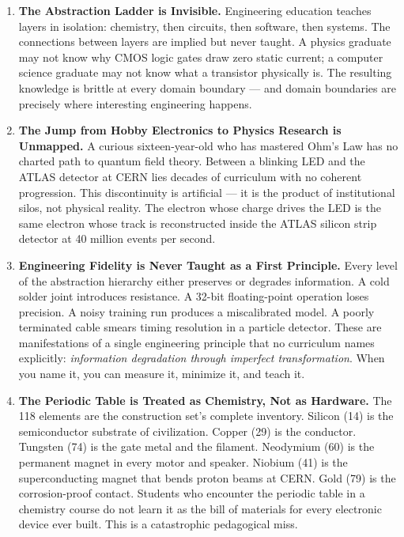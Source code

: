 \documentclass[11pt,letterpaper]{article}
\begin{document}
\begin{enumerate}[leftmargin=*, label=\textbf{P\arabic*.}]

\item \textbf{The Abstraction Ladder is Invisible.} Engineering education teaches layers in
isolation: chemistry, then circuits, then software, then systems. The connections between layers
are implied but never taught. A physics graduate may not know why CMOS logic gates draw zero
static current; a computer science graduate may not know what a transistor physically is. The
resulting knowledge is brittle at every domain boundary --- and domain boundaries are precisely
where interesting engineering happens.

\item \textbf{The Jump from Hobby Electronics to Physics Research is Unmapped.} A curious
sixteen-year-old who has mastered Ohm's Law has no charted path to quantum field theory. Between
a blinking LED and the ATLAS detector at CERN lies decades of curriculum with no coherent
progression. This discontinuity is artificial --- it is the product of institutional silos, not
physical reality. The electron whose charge drives the LED is the same electron whose track is
reconstructed inside the ATLAS silicon strip detector at 40 million events per second.

\item \textbf{Engineering Fidelity is Never Taught as a First Principle.} Every level of the
abstraction hierarchy either preserves or degrades information. A cold solder joint introduces
resistance. A 32-bit floating-point operation loses precision. A noisy training run produces a
miscalibrated model. A poorly terminated cable smears timing resolution in a particle detector.
These are manifestations of a single engineering principle that no curriculum names explicitly:
\textit{information degradation through imperfect transformation}. When you name it, you can
measure it, minimize it, and teach it.

\item \textbf{The Periodic Table is Treated as Chemistry, Not as Hardware.} The 118 elements are
the construction set's complete inventory. Silicon (14) is the semiconductor substrate of
civilization. Copper (29) is the conductor. Tungsten (74) is the gate metal and the filament.
Neodymium (60) is the permanent magnet in every motor and speaker. Niobium (41) is the
superconducting magnet that bends proton beams at CERN. Gold (79) is the corrosion-proof
contact. Students who encounter the periodic table in a chemistry course do not learn it as the
bill of materials for every electronic device ever built. This is a catastrophic pedagogical miss.


\end{enumerate}
\end{document}
